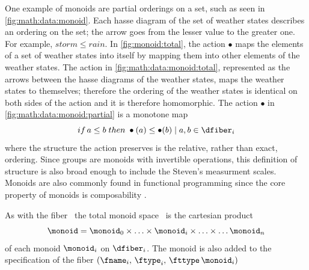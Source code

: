 \documentclass[../main.tex]{subfiles}
\begin{document}
One example of monoids are partial orderings on a set, such as seen in \autoref{fig:math:data:monoid}. Each hasse diagram of the set of weather states describes an ordering on the set; the arrow goes from the lesser value to the greater one. For example, $storm \leq rain$. In \autoref{fig:monoid:total}, the action $\bullet$ maps the elements of a set of weather states into itself by mapping them into other elements of the weather states. The action in  \autoref{fig:math:data:monoid:total}, represented as the arrows between the hasse diagrams of the weather states, maps the weather states to themselves; therefore the ordering of the weather states is identical on both sides of the action and it is therefore homomorphic. The action $\bullet$ in \autoref{fig:math:data:monoid:partial} is a monotone map\cite{fongInvitationAppliedCategory2019}
\begin{equation*}
    if\, a \leq b \; then \; \bullet(a) \leq \bullet(b) \mid a,b \in \dfiber_{i}
\end{equation*}
where the structure the action preserves is the relative, rather than exact, ordering. Since groups are monoids with invertible operations, this definition of structure is also broad enough to include the Steven's measurment scales\cite{stevensTheoryScalesMeasurement1946,leaFormalizationMeasurementScale}. Monoids are also commonly found in functional programming since the core property of monoids is composability \cite{yorgeyMonoidsThemeVariations}. 

As with the fiber \dfiber\, the total monoid space \monoid\ is the cartesian product
\begin{equation}
    \label{eq:math:data:monoid:decompose}
\monoid= \monoid_{0} \times \ldots \times \monoid_{i}\times \ldots \times\ldots \monoid_{n}
\end{equation}
of each monoid $\monoid_{i}$ on $\dfiber_{i}$.  The monoid is also added to the specification of the fiber $(\fname_i,\, \ftype_i,\, \fttype\, \monoid_i)$
\end{document}
